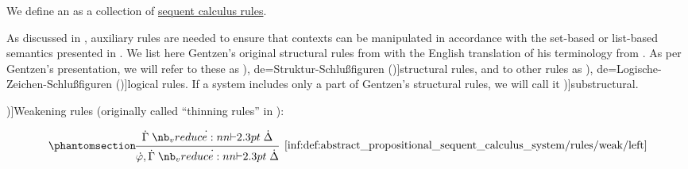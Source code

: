 \begin{definition}\label{def:abstract_propositional_sequent_calculus_system}\mimprovised
  We define an  as a collection of \hyperref[def:sequent_calculus_rule]{sequent calculus rules}.

  As discussed in , auxiliary rules are needed to ensure that contexts can be manipulated in accordance with the set-based or list-based semantics presented in . We list here Gentzen's original structural rules from \cite[192]{Gentzen1935LogischeSchließen} with the English translation of his terminology from \cite[296]{Gentzen1964LogicalDeduction}. As per Gentzen's presentation, we will refer to these as \term[ru=структурные правила (\cite[97]{КолмогоровДрагалин2006Логика}), de=Struktur-Schlu\ss{}figuren (\cite[191]{Gentzen1935LogischeSchließen})]{structural rules}, and to other rules as \term[ru=логические правила (\cite[97]{КолмогоровДрагалин2006Логика}), de=Logische-Zeichen-Schlu\ss{}figuren (\cite[191]{Gentzen1935LogischeSchließen})]{logical rules}. If a system includes only a part of Gentzen's structural rules, we will call it \term[en=substructural (\cite[91]{TroelstraSchwichtenberg2000BasicProofTheory})]{substructural}.

  \begin{thmenum}
     \term[ru=правила добавления (\cite[217]{КолмогоровДрагалин2006Логика})]{Weakening rules} (originally called \enquote{thinning rules} in \cite[296]{Gentzen1964LogicalDeduction}):
    \begin{paracol}{2}
      \begin{leftcolumn}
        \ParacolAlignmentHack
        \begin{equation*}\taglabel[\ensuremath{ \logic{Weak}_L }]{inf:def:abstract_propositional_sequent_calculus_system/rules/weak/left}
          \begin{prooftree}
            \hypo{ \syn\Gamma \synvdash \syn\Delta }
            \infer1[\ref{inf:def:abstract_propositional_sequent_calculus_system/rules/weak/left}]{ \syn\varphi, \syn\Gamma \synvdash \syn\Delta }
          \end{prooftree}
        \end{equation*}
      \end{leftcolumn}


\end{paracol}
\end{thmenum}
\end{definition}
